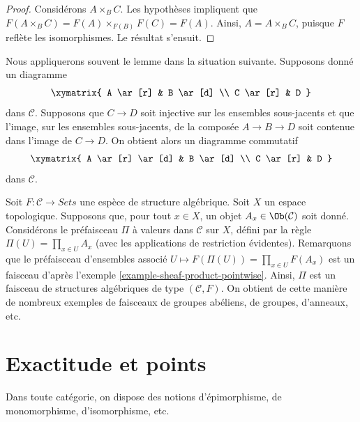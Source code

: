 \begin{proof}
Considérons $A \times_B C$. Les hypothèses impliquent que
$F(A \times_B C) = F(A) \times_{F(B)} F(C) = F(A)$.
Ainsi, $A = A \times_B C$, puisque $F$ reflète les isomorphismes.
Le résultat s'ensuit.
\end{proof}

\begin{example}
\label{example-application-lemma-image-contained-in}
Nous appliquerons souvent le lemme dans la situation suivante.
Supposons donné un diagramme
$$
\xymatrix{
A \ar[r] & B \ar[d] \\
C \ar[r] & D
}
$$
dans $\mathcal{C}$. Supposons que $C \to D$ soit injective sur les ensembles
sous-jacents et que l'image, sur les ensembles sous-jacents, de la composée
$A \to B \to D$ soit contenue dans l'image de $C \to D$.
On obtient alors un diagramme commutatif
$$
\xymatrix{
A \ar[r] \ar[d] & B \ar[d] \\
C \ar[r] & D
}
$$
dans $\mathcal{C}$.
\end{example}

\begin{example}
\label{example-sheaf-product-pointwise-algebraic-structure}
Soit $F : \mathcal{C} \to \textit{Sets}$ une espèce de structure algébrique.
Soit $X$ un espace topologique. Supposons que, pour tout $x \in X$, un objet
$A_x \in \Ob(\mathcal{C})$ soit donné. Considérons le préfaisceau $\Pi$ à
valeurs dans $\mathcal{C}$ sur $X$, défini par la règle
$\Pi(U) = \prod_{x \in U} A_x$ (avec les applications de restriction
évidentes). Remarquons que le préfaisceau d'ensembles associé
$U \mapsto F(\Pi(U)) = \prod_{x \in U} F(A_x)$ est un faisceau d'après
l'exemple \ref{example-sheaf-product-pointwise}.
Ainsi, $\Pi$ est un faisceau de structures algébriques de type
$(\mathcal{C} , F)$. On obtient de cette manière de nombreux exemples de
faisceaux de groupes abéliens, de groupes, d'anneaux, etc.
\end{example}












\section{Exactitude et points}
\label{section-exactness-points}

\noindent
Dans toute catégorie, on dispose des notions d'épimorphisme, de
monomorphisme, d'isomorphisme, etc.


